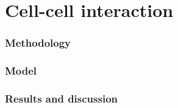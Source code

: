 \part{Cell-cell interaction}

\section{Methodology}

\section{Model}

\section{Results and discussion}